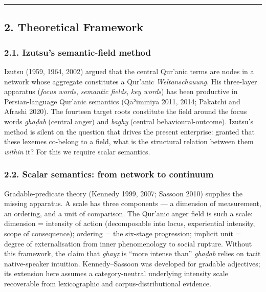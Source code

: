 \documentclass[11pt,a4paper]{article}
\begin{document}
\begin{center}\rule{0.5\linewidth}{0.5pt}\end{center}

\subsection{2. Theoretical Framework}\label{theoretical-framework}

\subsubsection{2.1. Izutsu's semantic-field
method}\label{izutsus-semantic-field-method}

Izutsu (1959, 1964, 2002) argued that the central Qur'anic terms are
nodes in a network whose aggregate constitutes a Qur'anic
\emph{Weltanschauung}. His three-layer apparatus (\emph{focus words},
\emph{semantic fields}, \emph{key words}) has been productive in
Persian-language Qur'anic semantics (Qāʾimīniyā 2011, 2014; Pakatchi and
Afrashi 2020). The fourteen target roots constitute the field around the
focus words \emph{ghaḍab} (central anger) and \emph{baghy} (central
behavioural-outcome). Izutsu's method is silent on the question that
drives the present enterprise: granted that these lexemes co-belong to a
field, what is the structural relation between them \emph{within} it?
For this we require scalar semantics.

\subsubsection{2.2. Scalar semantics: from network to
continuum}\label{scalar-semantics-from-network-to-continuum}

Gradable-predicate theory (Kennedy 1999, 2007; Sassoon 2010) supplies
the missing apparatus. A scale has three components --- a dimension of
measurement, an ordering, and a unit of comparison. The Qur'anic anger
field is such a scale: dimension = intensity of action (decomposable
into locus, experiential intensity, scope of consequence); ordering =
the six-stage progression; implicit unit = degree of externalisation
from inner phenomenology to social rupture. Without this framework, the
claim that \emph{ghayẓ} is ``more intense than'' \emph{ghaḍab} relies on
tacit native-speaker intuition. Kennedy--Sassoon was developed for
gradable adjectives; its extension here assumes a category-neutral
underlying intensity scale recoverable from lexicographic and
corpus-distributional evidence.
\end{document}
